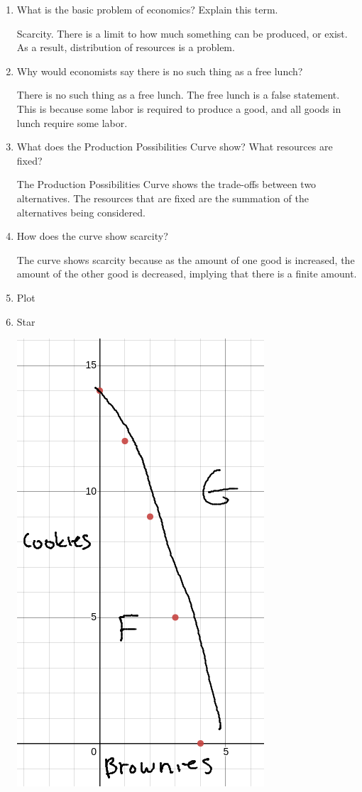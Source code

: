 \documentclass{scrreprt} %
\begin{document}
\begin{enumerate}

\item What is the basic problem of economics? Explain this term.

Scarcity. There is a limit to how much something can be produced, or exist.
As a result, distribution of resources is a problem.

\item Why would economists say there is no such thing as a free lunch? 

There is no such thing as a free lunch. The free lunch is a false
statement. This is because some labor is required to produce a good, and all
goods in lunch require some labor.

\item What does the Production Possibilities Curve show? What resources are fixed?

The Production Possibilities Curve shows the trade-offs between two
alternatives. The resources that are fixed are the summation of the alternatives
being considered.

\item How does the curve show scarcity?

The curve shows scarcity because as the amount of one good is increased, the
amount of the other good is decreased, implying that there is a finite amount.

\item Plot
\item Star

\includegraphics[scale=0.4]{2021-08-24-13-20-08.png}


\end{enumerate}
\end{document}
